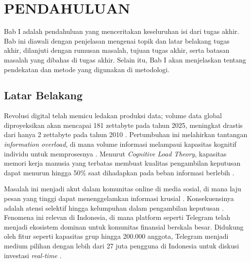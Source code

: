 \chapter{PENDAHULUAN}
\label{chap:pendahuluan}

Bab I adalah pendahuluan yang menceritakan keseluruhan isi dari tugas akhir. Bab ini diawali dengan penjelasan mengenai topik dan latar belakang tugas akhir, dilanjuti dengan rumusan masalah, tujuan tugas akhir, serta batasan masalah yang dibahas di tugas akhir. Selain itu, Bab I akan menjelaskan tentang pendekatan dan metode yang digunakan di metodologi.

\section{Latar Belakang}
Revolusi digital telah memicu ledakan produksi data; volume data global diproyeksikan akan mencapai 181 zettabyte pada tahun 2025, meningkat drastis dari hanya 2 zettabyte pada tahun 2010 \autocite{idc2025}. Pertumbuhan ini melahirkan tantangan \textit{information overload}, di mana volume informasi melampaui kapasitas kognitif individu untuk memprosesnya \autocite{eppler2004}. Menurut \textit{Cognitive Load Theory}, kapasitas memori kerja manusia yang terbatas membuat kualitas pengambilan keputusan dapat menurun hingga 50\% saat dihadapkan pada beban informasi berlebih \autocite{sweller1988,arnold2023}.

Masalah ini menjadi akut dalam komunitas online di media sosial, di mana laju pesan yang tinggi dapat menenggelamkan informasi krusial \autocite{nematzadeh2019}. Konsekuensinya adalah atensi selektif hingga kelumpuhan dalam pengambilan keputusan \autocite{edmunds2000}. Fenomena ini relevan di Indonesia, di mana platform seperti Telegram telah menjadi ekosistem dominan untuk komunitas finansial berskala besar. Didukung oleh fitur seperti kapasitas grup hingga 200.000 anggota, Telegram menjadi medium pilihan dengan lebih dari 27 juta pengguna di Indonesia untuk diskusi investasi \textit{real-time} \autocite{statista2024,perlo2025}.

